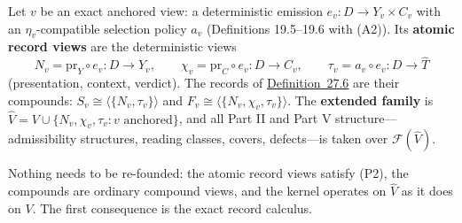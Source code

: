 \begin{thmdef}

Let \(v\) be an exact anchored view: a deterministic emission \(e_v : D \to Y_v \times C_v\) with an \(\eta_v\)-compatible selection policy \(a_v\) (Definitions 19.5--19.6 with (A2)). Its \textbf{atomic record views} are the deterministic views
\[
N_v = \mathrm{pr}_Y \circ e_v : D \to Y_v,
\qquad
\chi_v = \mathrm{pr}_C \circ e_v : D \to C_v,
\qquad
\tau_v = a_v \circ e_v : D \to \widehat{T}
\]
(presentation, context, verdict). The records of \hyperlink{stmt:27.6}{Definition~27.6} are their compounds: \(S_v \cong \langle \{N_v, \tau_v\} \rangle\) and \(F_v \cong \langle \{N_v, \chi_v, \tau_v\} \rangle\). The \textbf{extended family} is \(\widehat{V} = V \cup \{N_v, \chi_v, \tau_v : v \text{ anchored}\}\), and all Part II and Part V structure---\hspace{0pt}admissibility structures, reading classes, covers, defects---\hspace{0pt}is taken over \(\mathcal{F}(\widehat{V})\).
\end{thmdef}

Nothing needs to be re-founded: the atomic record views satisfy (P2), the compounds are ordinary compound views, and the kernel operates on \(\widehat{V}\) as it does on \(V\). The first consequence is the exact record calculus.

